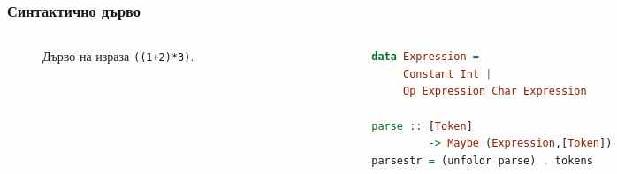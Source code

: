 \documentclass{beamer}
\begin{document}
\begin{frame}[fragile]
  \frametitle{Синтактично дърво}


\begin{columns}[t]
  \begin{column}{0.3\textwidth}

    \begin{figure}
      \centering
      \caption{Дърво на израза \texttt{((1+2)*3)}.}
      \label{fig:treeexpr}
      \end{figure}
      

  \end{column}
  \begin{column}{0.7\textwidth}

\begin{lstlisting}[basicstyle=\small,language=Haskell]
data Expression = 
     Constant Int | 
     Op Expression Char Expression

parse :: [Token] 
         -> Maybe (Expression,[Token])     
parsestr = (unfoldr parse) . tokens
\end{lstlisting}

  \end{column}
\end{columns}

\end{frame}  
  
\end{document}
